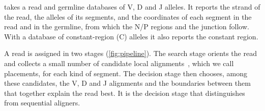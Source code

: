 \documentclass[11pt,a4paper]{article}
\begin{document}
\swig{} takes a read and germline databases of V, D and J alleles. It
reports the strand of the read, the alleles of its segments, and the
coordinates of each segment in the read and in the germline, from which the
N/P regions and the junction follow. With a database of constant-region (C)
alleles it also reports the constant region.

A read is assigned in two stages (\cref{fig:pipeline}). The search stage
orients the read and collects a small number of candidate local
alignments~\cite{smith1981,gotoh1982}, which we call placements, for each
kind of segment. The decision stage then
chooses, among these candidates, the V, D and J alignments and the
boundaries between them that together explain the read best. It is the
decision stage that distinguishes \swig{} from sequential aligners.
\end{document}
